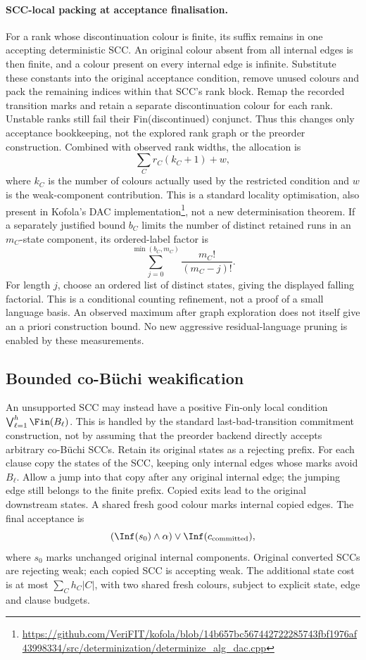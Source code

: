 \paragraph{SCC-local packing at acceptance finalisation.}
For a rank whose discontinuation colour is finite, its suffix remains in
one accepting deterministic SCC. An original colour absent from all
internal edges is then finite, and a colour present on every internal
edge is infinite. Substitute these constants into the original acceptance
condition, remove unused colours and pack the remaining indices within
that SCC's rank block. Remap the recorded transition marks and retain a
separate discontinuation colour for each rank. Unstable ranks still fail
their Fin(discontinued) conjunct. Thus this changes only acceptance
bookkeeping, not the explored rank graph or the preorder construction.
Combined with observed rank widths, the allocation is
\[
 \sum_C r_C(k_C+1)+w,
\]
where $k_C$ is the number of colours actually used by the restricted
condition and $w$ is the weak-component contribution. This is a standard
locality optimisation, also present in Kofola's DAC implementation\footnote{\url{https://github.com/VeriFIT/kofola/blob/14b657bc567442722285743fbf1976af43998334/src/determinization/determinize_alg_dac.cpp}}, not
a new determinisation theorem.
If a separately justified bound $b_C$ limits the number of distinct
retained runs in an $m_C$-state component, its ordered-label factor is
\[
 \sum_{j=0}^{\min(b_C,m_C)}\frac{m_C!}{(m_C-j)!}.
\]
For length $j$, choose an ordered list of distinct states, giving the
displayed falling factorial. This is a conditional counting refinement,
not a proof of a small language basis. An observed maximum after graph
exploration does not itself give an a priori construction bound. No new
aggressive residual-language pruning is enabled by these measurements.

\subsection{Bounded co-B\"uchi weakification}
An unsupported SCC may instead have a positive Fin-only local condition
$\bigvee_{\ell=1}^h\Fin(B_\ell)$. This is handled by the standard
last-bad-transition commitment construction, not by assuming that the
preorder backend directly accepts arbitrary co-B\"uchi SCCs.
Retain its original states as a rejecting prefix. For each clause copy
the states of the SCC, keeping only internal edges whose marks avoid
$B_\ell$. Allow a jump into that copy after any original internal edge;
the jumping edge still belongs to the finite prefix. Copied exits lead
to the original downstream states. A shared fresh good colour marks
internal copied edges. The final acceptance is
\[
 (\Inf(s_0)\land\alpha)\lor\Inf(c_{\rm committed}),
\]
where $s_0$ marks unchanged original internal components.
Original converted SCCs are rejecting weak; each copied SCC is accepting
weak. The additional state cost is at most $\sum_C h_C|C|$, with two shared fresh
colours, subject to explicit state, edge and clause budgets.

